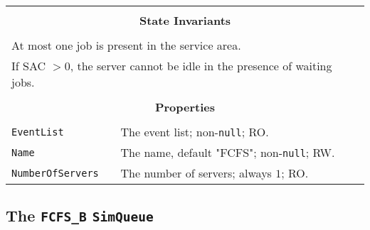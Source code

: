 \documentclass[12pt]{book}
\begin{document}
\begin{tabular}{|l|l|l|}
\hline
\multicolumn{3}{|c|}{} \\
\multicolumn{3}{|c|}{\bf State  Invariants} \\
\multicolumn{3}{|c|}{} \\
\hline
\multicolumn{3}{|l|}{At most one job is present in the service area.} \\
\multicolumn{3}{|l|}{If SAC $> 0$, the server cannot be idle in the presence of waiting jobs.} \\
\hline
\multicolumn{3}{|c|}{} \\
\multicolumn{3}{|c|}{\bf Properties} \\
\multicolumn{3}{|c|}{} \\
\hline
\lstinline|EventList|       & \multicolumn{2}{|l|}{The event list; non-\lstinline|null|; RO.} \\
\hline
\lstinline|Name|            & \multicolumn{2}{|l|}{The name, default "FCFS"; non-\lstinline|null|; RW.} \\
\hline
\lstinline|NumberOfServers| & \multicolumn{2}{|l|}{The number of servers; always $1$; RO.} \\
\hline
\end{tabular}

\subsection{The \lstinline{FCFS_B} \lstinline{SimQueue}}
\end{document}

